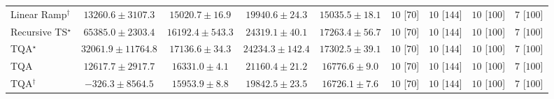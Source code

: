 \begin{tabular}{l|cccc|cccc|}
Linear Ramp$^\dagger$ & {\cellcolor[HTML]{C9DBEA}} \color[HTML]{000000} $13260.6\pm 3107.3$ & {\cellcolor[HTML]{C4D7E8}} \color[HTML]{000000} $15020.7\pm 16.9$ & {\cellcolor[HTML]{B5CCE3}} \color[HTML]{000000} $19940.6\pm 24.3$ & {\cellcolor[HTML]{C4D7E8}} \color[HTML]{000000} $15035.5\pm 18.1$ & {\cellcolor[HTML]{49006A}} \color[HTML]{F1F1F1} $10$ [$70$] & {\cellcolor[HTML]{49006A}} \color[HTML]{F1F1F1} $10$ [$144$] & {\cellcolor[HTML]{49006A}} \color[HTML]{F1F1F1} $10$ [$100$] & {\cellcolor[HTML]{FFF7F3}} \color[HTML]{000000} $7$ [$100$] \\
Recursive TS$^\star$ & {\cellcolor[HTML]{84278C}} \color[HTML]{F1F1F1} $65385.0\pm 2303.4$ & {\cellcolor[HTML]{C1D4E7}} \color[HTML]{000000} $16192.4\pm 543.3$ & {\cellcolor[HTML]{A8C3DE}} \color[HTML]{000000} $24319.1\pm 40.1$ & {\cellcolor[HTML]{BED2E6}} \color[HTML]{000000} $17263.4\pm 56.7$ & {\cellcolor[HTML]{49006A}} \color[HTML]{F1F1F1} $10$ [$70$] & {\cellcolor[HTML]{49006A}} \color[HTML]{F1F1F1} $10$ [$144$] & {\cellcolor[HTML]{49006A}} \color[HTML]{F1F1F1} $10$ [$100$] & {\cellcolor[HTML]{FFF7F3}} \color[HTML]{000000} $7$ [$100$] \\
TQA$^\star$ & {\cellcolor[HTML]{96ACD2}} \color[HTML]{F1F1F1} $32061.9\pm 11764.8$ & {\cellcolor[HTML]{BED2E6}} \color[HTML]{000000} $17136.6\pm 34.3$ & {\cellcolor[HTML]{A8C3DE}} \color[HTML]{000000} $24234.3\pm 142.4$ & {\cellcolor[HTML]{BDD1E5}} \color[HTML]{000000} $17302.5\pm 39.1$ & {\cellcolor[HTML]{49006A}} \color[HTML]{F1F1F1} $10$ [$70$] & {\cellcolor[HTML]{49006A}} \color[HTML]{F1F1F1} $10$ [$144$] & {\cellcolor[HTML]{49006A}} \color[HTML]{F1F1F1} $10$ [$100$] & {\cellcolor[HTML]{FFF7F3}} \color[HTML]{000000} $7$ [$100$] \\
TQA & {\cellcolor[HTML]{CBDCEB}} \color[HTML]{000000} $12617.7\pm 2917.7$ & {\cellcolor[HTML]{C0D4E6}} \color[HTML]{000000} $16331.0\pm 4.1$ & {\cellcolor[HTML]{B1C9E1}} \color[HTML]{000000} $21160.4\pm 21.2$ & {\cellcolor[HTML]{BFD3E6}} \color[HTML]{000000} $16776.6\pm 9.0$ & {\cellcolor[HTML]{49006A}} \color[HTML]{F1F1F1} $10$ [$70$] & {\cellcolor[HTML]{49006A}} \color[HTML]{F1F1F1} $10$ [$144$] & {\cellcolor[HTML]{49006A}} \color[HTML]{F1F1F1} $10$ [$100$] & {\cellcolor[HTML]{FFF7F3}} \color[HTML]{000000} $7$ [$100$] \\
TQA$^\dagger$ & {\cellcolor[HTML]{EEF5F9}} \color[HTML]{000000} $-326.3\pm 8564.5$ & {\cellcolor[HTML]{C1D4E7}} \color[HTML]{000000} $15953.9\pm 8.8$ & {\cellcolor[HTML]{B5CCE3}} \color[HTML]{000000} $19842.5\pm 23.5$ & {\cellcolor[HTML]{BFD3E6}} \color[HTML]{000000} $16726.1\pm 7.6$ & {\cellcolor[HTML]{49006A}} \color[HTML]{F1F1F1} $10$ [$70$] & {\cellcolor[HTML]{49006A}} \color[HTML]{F1F1F1} $10$ [$144$] & {\cellcolor[HTML]{49006A}} \color[HTML]{F1F1F1} $10$ [$100$] & {\cellcolor[HTML]{FFF7F3}} \color[HTML]{000000} $7$ [$100$] \\

\end{tabular}
